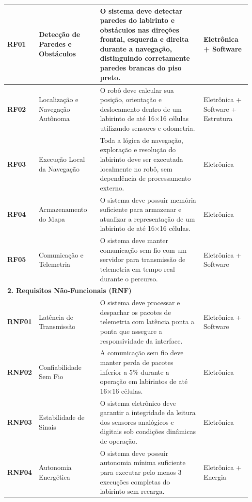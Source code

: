 \begin{apendicesenv}
\begin{longtable}{|p{}|p{}|p{}|p{}|}
    \textbf{RF01} & Detecção de Paredes e Obstáculos & O sistema deve detectar paredes do labirinto e obstáculos nas direções frontal, esquerda e direita durante a navegação, distinguindo corretamente paredes brancas do piso preto. & Eletrônica + Software \\ \hline
    
    \textbf{RF02} & Localização e Navegação Autônoma & O robô deve calcular sua posição, orientação e deslocamento dentro de um labirinto de até 16×16 células utilizando sensores e odometria. & Eletrônica + Software + Estrutura \\ \hline
    
    \textbf{RF03} & Execução Local da Navegação & Toda a lógica de navegação, exploração e resolução do labirinto deve ser executada localmente no robô, sem dependência de processamento externo. & Eletrônica \\ \hline
    
    \textbf{RF04} & Armazenamento do Mapa & O sistema deve possuir memória suficiente para armazenar e atualizar a representação de um labirinto de até 16×16 células. & Eletrônica \\ \hline
    
    \textbf{RF05} & Comunicação e Telemetria & O sistema deve manter comunicação sem fio com um servidor para transmissão de telemetria em tempo real durante o percurso. & Eletrônica + Software \\ \hline

    \multicolumn{4}{|l|}{\textbf{2. Requisitos Não-Funcionais (RNF)}} \\ \hline
    
    \textbf{RNF01} & Latência de Transmissão & O sistema deve processar e despachar os pacotes de telemetria com latência ponta a ponta que assegure a responsividade da interface. & Eletrônica + Software \\ \hline

    \textbf{RNF02} & Confiabilidade Sem Fio & A comunicação sem fio deve manter perda de pacotes inferior a 5\% durante a operação em labirintos de até 16×16 células. & Eletrônica \\ \hline

    \textbf{RNF03} & Estabilidade de Sinais & O sistema eletrônico deve garantir a integridade da leitura dos sensores analógicos e digitais sob condições dinâmicas de operação. & Eletrônica \\ \hline

    \textbf{RNF04} & Autonomia Energética & O sistema deve possuir autonomia mínima suficiente para executar pelo menos 3 execuções completas do labirinto sem recarga. & Eletrônica + Energia \\ \hline
    

\end{longtable}
\end{apendicesenv}
